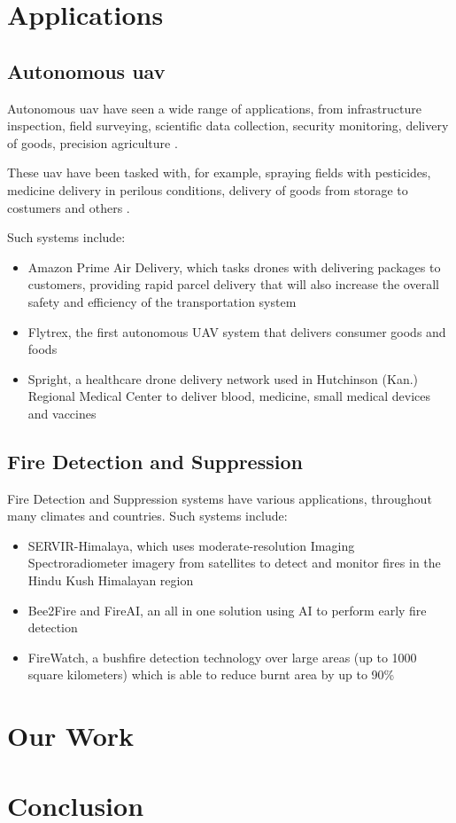 \documentclass[runningheads]{llncs}
\begin{document}
\section{Applications}

\subsection{Autonomous \acrshort{uav}}

Autonomous \acrshort{uav} have seen a wide range of applications, from  infrastructure inspection, field surveying, scientific data collection, security monitoring, delivery of goods, precision agriculture \cite{Malka_2017}.

These \acrshort{uav} have been tasked with, for example, spraying fields with pesticides, medicine delivery in perilous conditions, delivery of goods from storage to costumers and others \cite{Malka_2017}.

Such systems include:

\begin{itemize}
	\item Amazon Prime Air Delivery, which tasks drones with delivering packages to customers, providing rapid parcel delivery that will also increase the overall safety and efficiency of the transportation system \cite{article}
	\item Flytrex, the first autonomous UAV system that delivers consumer goods and foods \cite{Malka_2017}
	\item Spright, a healthcare drone delivery network used in Hutchinson (Kan.) Regional Medical Center to deliver blood, medicine, small medical devices and vaccines \cite{Drees_2021}
\end{itemize}

\subsection{Fire Detection and Suppression}

Fire Detection and Suppression systems have various applications, throughout many climates and countries. Such systems include:

\begin{itemize}
	\item SERVIR-Himalaya, which uses moderate-resolution Imaging Spectroradiometer imagery from satellites to detect and monitor fires in the Hindu Kush Himalayan region \cite{SERVIR_2012}
	\item Bee2Fire and FireAI, an all in one solution using AI to perform early fire detection \cite{SilvaPinto_2021}
	\item FireWatch, a bushfire detection technology over large areas (up to 1000 square kilometers) which is able to reduce burnt area by up to 90\% \cite{FireWatchAustralia_2010}
\end{itemize}

\section{Our Work}
\section{Conclusion}


\end{document}
